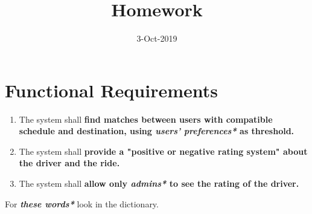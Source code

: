 \documentclass[12pt]{article}
\title{Homework}
\date{3-Oct-2019}
\begin{document}
	\maketitle
	
	\section*{Functional Requirements}
	\begin{enumerate}
		\item The system shall \textbf{find matches between users with compatible schedule and destination, using \emph{users' preferences*} as threshold.}
		\item The system shall \textbf{provide a "positive or negative rating system" about the driver and the ride.}
		\item The system shall \textbf{allow only \emph{admins*} to see the rating of the driver.}
	\end{enumerate}
	For \textbf{\emph{these words*}} look in the dictionary.
\end{document}
